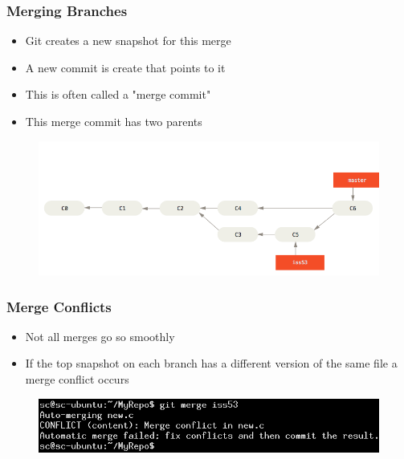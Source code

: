 \documentclass{beamer}
\begin{document}
\begin{frame}
	\frametitle{Merging Branches}
	\begin{itemize}
		\item{Git creates a new snapshot for this merge}
		\item{A new commit is create that points to it}
		\item{This is often called a "merge commit"}
		\item{This merge commit has two parents}
	\end{itemize}
	\begin{figure}
		\includegraphics[scale=0.38]{Merging_Branches-8.png}
	\end{figure}
\end{frame}

\begin{frame}
	\frametitle{Merge Conflicts}
	\begin{itemize}
		\item{Not all merges go so smoothly}
		\item{If the top snapshot on each branch has a different version of the same file a merge conflict occurs}
	\end{itemize}
	\begin{figure}
		\includegraphics[scale=0.4]{Merging_Branches-9.png}
	\end{figure}
\end{frame}
\end{document}
